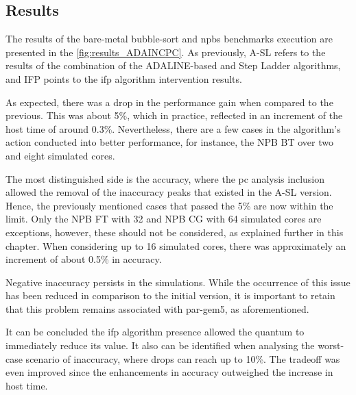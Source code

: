 \subsection{Results}

The results of the bare-metal bubble-sort and \glspl{npb} benchmarks execution are presented in the \autoref{fig:results_ADAINCPC}. As previously, 
A-SL refers to the results of the combination of the ADALINE-based and Step Ladder algorithms, and IFP points to the 
\gls{ifp} algorithm intervention results.

As expected, there was a drop in the performance gain when compared to the previous. This was about 5\%, which in practice, 
reflected in an increment of the host time of around 0.3\%. Nevertheless, there are a few cases in the algorithm's action 
conducted into better performance, for instance, the NPB BT over two and eight simulated cores. 

The most distinguished side is the accuracy, where the \gls{pc} analysis inclusion allowed the removal of the inaccuracy peaks that existed 
in the A-SL version. Hence, the previously mentioned cases that passed the 5\% are now within the limit. Only the NPB FT with 32
and NPB CG with 64 simulated cores are exceptions, however, these should not be considered, as explained further in this chapter. 
When considering up to 16 simulated cores, there was approximately an increment 
of about 0.5\% in accuracy. 

Negative inaccuracy persists in the simulations. While the occurrence of this issue has been reduced in comparison to the initial version, 
it is important to retain that this problem remains associated with par-gem5, as aforementioned. 

It can be concluded the \gls{ifp} algorithm presence allowed the quantum to immediately reduce its value. It also can be identified when 
analysing the worst-case scenario of inaccuracy, where drops can reach up to 10\%. The tradeoff was even improved since 
the enhancements in accuracy outweighed the increase in host time.

